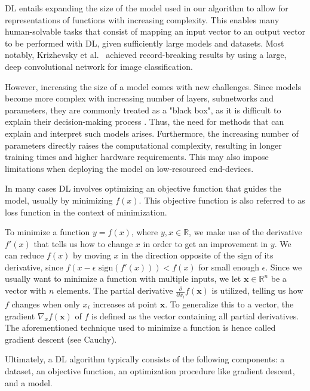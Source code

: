 DL entails expanding the size of the model used in our algorithm to allow for representations of functions with increasing complexity. This enables many human-solvable tasks that consist of mapping an input vector to an output vector to be performed with DL, given sufficiently large models and datasets. Most notably, Krizhevsky et al.~\cite{krizhevsky2012imagenet} achieved record-breaking results by using a large, deep convolutional network for image classification.

However, increasing the size of a model comes with new challenges. Since models become more complex with increasing number of layers, subnetworks and parameters, they are commonly treated as a "black box", as it is difficult to explain their decision-making process \cite{noor2024survey}. Thus, the need for methods that can explain and interpret such models arises. Furthermore, the increasing number of parameters directly raises the computational complexity, resulting in longer training times and higher hardware requirements. This may also impose limitations when deploying the model on low-resourced end-devices. \bigskip

In many cases DL involves optimizing an objective function that guides the model, usually by minimizing $f(x)$. This objective function is also referred to as loss function in the context of minimization. %

To minimize a function $y = f(x)$, where $y,x \in \mathbb{R}$, we make use of the derivative $f'(x)$ that tells us how to change $x$ in order to get an improvement in $y$. We can reduce $f(x)$ by moving $x$ in the direction opposite of the sign of its derivative, since $f(x-\epsilon \text{ sign}(f'(x))) < f(x)$ for small enough $\epsilon$. Since we usually want to minimize a function with multiple inputs, we let $\mathbf{x} \in \mathbb{R}^n$ be a vector with $n$ elements. The partial derivative $\frac{\partial}{\partial x_i}f(\mathbf{x})$ is utilized, telling us how $f$ changes when only $x_i$ increases at point $\mathbf{x}$. To generalize this to a vector, the gradient $\nabla_xf(\mathbf{x})$ of $f$ is defined as the vector containing all partial derivatives. The aforementioned technique used to minimize a function is hence called gradient descent (see Cauchy\cite{cauchy1847methode}).

Ultimately, a DL algorithm typically consists of the following components: a dataset, an objective function, an optimization procedure like gradient descent, and a model. \bigskip%

